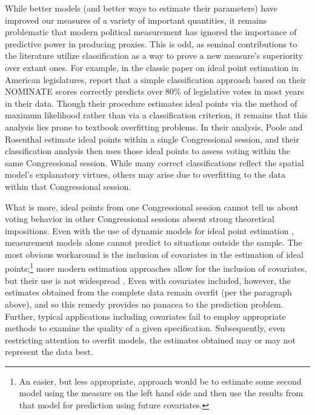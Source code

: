 While better models (and better ways to estimate their parameters) have improved our measures of a variety of important quantities, it remains problematic that modern political measurement has ignored the importance of predictive power in producing proxies.  This is odd, as seminal contributions to the literature utilize classification as a way to prove a new measure's superiority over extant ones. For example, in the classic paper on ideal point estimation in American legislatures, \citet[Table 3]{poole1985} report that a simple classification approach based on their NOMINATE scores correctly predicts over 80\% of legislative votes in most years in their data. Though their procedure estimates ideal points via the method of maximum likelihood rather than via a classification criterion, it remains that this analysis lies prone to textbook overfitting problems.  In their analysis, Poole and Rosenthal estimate ideal points within a single Congressional session, and their classification analysis then uses those ideal points to assess voting within the same Congressional session.  While many correct classifications reflect the spatial model's explanatory virtues, others may arise due to overfitting to the data within that Congressional session.

What is more, ideal points from one Congressional session cannot tell us about voting behavior in other Congressional sessions absent strong theoretical impositions.  Even with the use of dynamic models for ideal point estimation \citep{martin2002}, measurement models alone cannot predict to situations outside the sample.  The most obvious workaround is the inclusion of covariates in the estimation of ideal points;\footnote{An easier, but less appropriate, approach would be to estimate some second model using the measure on the left hand side and then use the results from that model for prediction using future covariates.} more modern estimation approaches \citep{clinton2004} allow for the inclusion of covariates, but their use is not widespread \citep[for an exception, see][]{bailey2001}.  Even with covariates included, however, the estimates obtained from the complete data remain overfit (per the paragraph above), and so this remedy provides no panacea to the prediction problem.  Further, typical applications including covariates fail to employ appropriate methods to examine the quality of a given specification.  Subsequently, even restricting attention to overfit models, the estimates obtained may or may not represent the data best.

